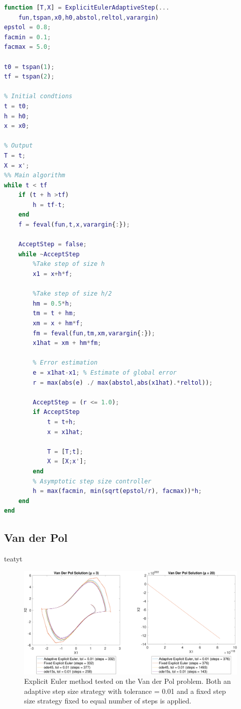 \begin{adjustwidth*}{0cm}{-0.4cm}
\begin{lstlisting}[language=Matlab,caption=Explicit Euler (adaptive step size), label=ExplicitEulerFixie]
function [T,X] = ExplicitEulerAdaptiveStep(...
    fun,tspan,x0,h0,abstol,reltol,varargin)
epstol = 0.8;
facmin = 0.1;
facmax = 5.0;

t0 = tspan(1);
tf = tspan(2);

% Initial condtions
t = t0;
h = h0;
x = x0;

% Output
T = t;
X = x';
%% Main algorithm
while t < tf
    if (t + h >tf)
        h = tf-t;
    end
    f = feval(fun,t,x,varargin{:});

    AcceptStep = false;
    while ~AcceptStep
        %Take step of size h
        x1 = x+h*f;

        %Take step of size h/2
        hm = 0.5*h;
        tm = t + hm;
        xm = x + hm*f;
        fm = feval(fun,tm,xm,varargin{:});
        x1hat = xm + hm*fm;

        % Error estimation
        e = x1hat-x1; % Estimate of global error
        r = max(abs(e) ./ max(abstol,abs(x1hat).*reltol));

        AcceptStep = (r <= 1.0);
        if AcceptStep
            t = t+h;
            x = x1hat;

            T = [T;t];
            X = [X;x'];
        end
        % Asymptotic step size controller
        h = max(facmin, min(sqrt(epstol/r), facmax))*h;
    end
end
\end{lstlisting}
\end{adjustwidth*}

\subsection{Van der Pol}
teatyt
\begin{figure}[H]
    \centering
    \includegraphics[width=\textwidth]{plots/2_4main_02.pdf}
    \caption{Explicit Euler method tested on the Van der Pol problem. Both an adaptive step size strategy with tolerance = 0.01 and a fixed step size strategy fixed to equal number of steps is applied.}
    \label{fig:2_4a}
\end{figure}

